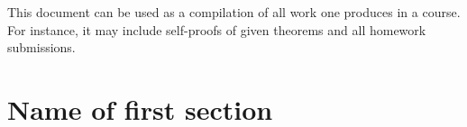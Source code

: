 \documentclass[11pt, a4paper]{book}
\begin{document}
\frontmatter
%
\thispagestyle{empty} %
%
\tableofcontents
\thispagestyle{empty}
\newpage
\setcounter{page}{1}
%
\mainmatter
{}
This document can be used as a compilation of all work one produces in a course. For instance, it may include self-proofs of given theorems and all homework submissions.
%
%
%
%
%
\section{Name of first section}


\backmatter
\end{document}
